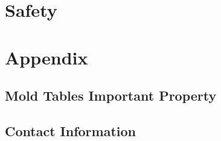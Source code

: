 \documentclass{article}
\begin{document}
\section{Safety}
\section{Appendix}
\subsection{Mold Tables Important Property}\label{Mold_Tables}
\subsection{Contact Information}
\end{document}
